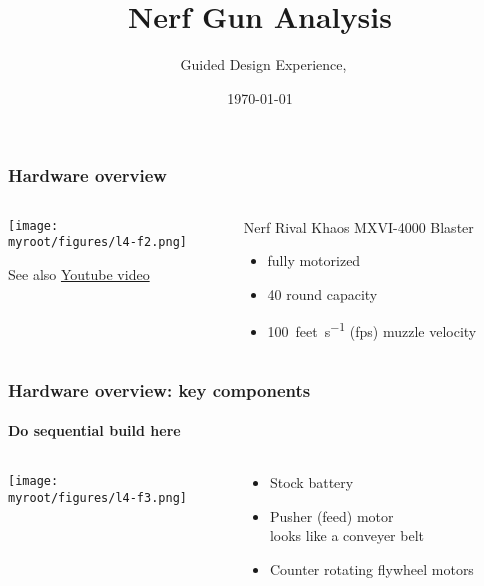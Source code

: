 \documentclass[aspectratio=169]{beamer}
\title{Nerf Gun Analysis}
\subtitle{\usnaCourseNumber\ Guided Design Experience, \usnaCourseTerm}
\author{\usnaInstructorShort}
\date{\today}
\newcommand{\myroot}{../..}
\begin{document}
\settitlebg
\begin{frame}
\titlepage
\end{frame}

\setslidebg
\begin{frame}
\frametitle{Hardware overview}
\begin{columns}
\begin{column}{0.5\textwidth}
\begin{center}
\texttt{[image: \\myroot/figures/l4-f2.png]}
\end{center}
See also \href{https://www.youtube.com/watch?v=9VSw_hHrUsY&feature=youtu.be&t=1}{Youtube video}
\end{column}
\begin{column}{0.5\textwidth}
Nerf Rival Khaos MXVI-4000 Blaster
\begin{itemize}
\item fully motorized
\item 40 round capacity
\item \SI{100}{feet\per\second} (fps) muzzle velocity
\end{itemize}
\end{column}
\end{columns}
\end{frame}

\begin{frame}
\frametitle{Hardware overview: key components}
\framesubtitle{Do sequential build here}
\begin{columns}
\begin{column}{0.66\textwidth}
\begin{center}
\texttt{[image: \\myroot/figures/l4-f3.png]}
\end{center}
\end{column}
\begin{column}{0.33\textwidth}
\begin{itemize}
\item Stock battery
\item Pusher (feed) motor\\
{\scriptsize looks like a conveyer belt}
\item Counter rotating flywheel motors
\end{itemize}
\end{column}
\end{columns}
\end{frame}
\end{document}
